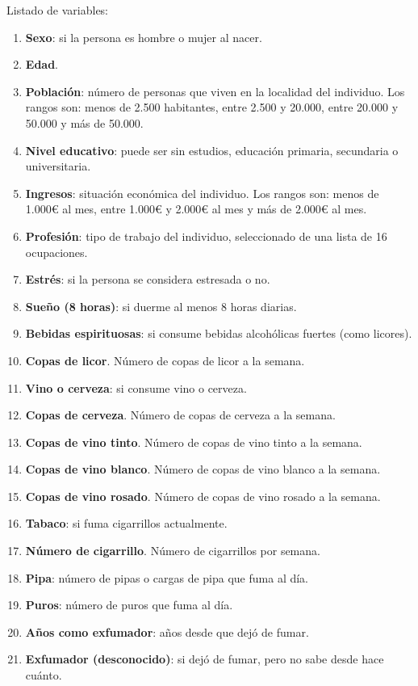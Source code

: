 Listado de variables:
\begin{enumerate}
    \item \textbf{Sexo}: si la persona es hombre o mujer al nacer.
    \item \textbf{Edad}.
    \item \textbf{Población}: número de personas que viven en la localidad del individuo. Los rangos son: menos de 2.500 habitantes, entre 2.500 y 20.000, entre 20.000 y 50.000 y más de 50.000.
    \item \textbf{Nivel educativo}: puede ser sin estudios, educación primaria, secundaria o universitaria.
    \item \textbf{Ingresos}: situación económica del individuo. Los rangos son: menos de 1.000€ al mes, entre 1.000€ y 2.000€ al mes y más de 2.000€ al mes.
    \item \textbf{Profesión}: tipo de trabajo del individuo, seleccionado de una lista de 16 ocupaciones.
    \item \textbf{Estrés}: si la persona se considera estresada o no.
    \item \textbf{Sueño (8 horas)}: si duerme al menos 8 horas diarias.
    \item \textbf{Bebidas espirituosas}: si consume bebidas alcohólicas fuertes (como licores).
    \item \textbf{Copas de licor}. Número de copas de licor a la semana.
    \item \textbf{Vino o cerveza}: si consume vino o cerveza.
    \item \textbf{Copas de cerveza}. Número de copas de cerveza a la semana.
    \item \textbf{Copas de vino tinto}. Número de copas de vino tinto a la semana.
    \item \textbf{Copas de vino blanco}. Número de copas de vino blanco a la semana.
    \item \textbf{Copas de vino rosado}. Número de copas de vino rosado a la semana.
    \item \textbf{Tabaco}: si fuma cigarrillos actualmente.
    \item \textbf{Número de cigarrillo}. Número de cigarrillos por semana.
    \item \textbf{Pipa}: número de pipas o cargas de pipa que fuma al día.
    \item \textbf{Puros}: número de puros que fuma al día.
    \item \textbf{Años como exfumador}: años desde que dejó de fumar.
    \item \textbf{Exfumador (desconocido)}: si dejó de fumar, pero no sabe desde hace cuánto.

\end{enumerate}
